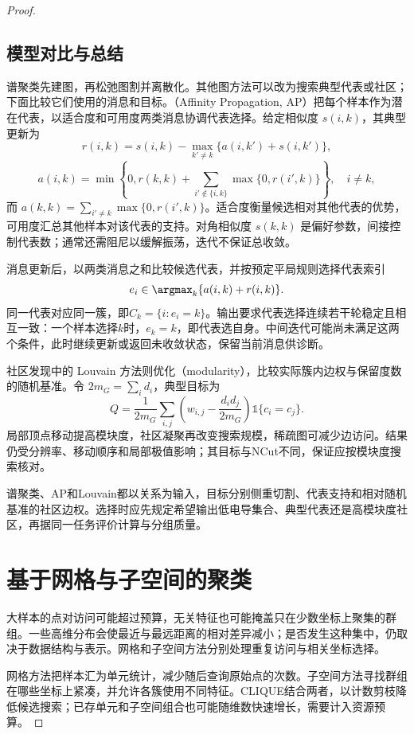 \begin{proof}
\subsection{模型对比与总结}

谱聚类先建图，再松弛图割并离散化。其他图方法可以改为搜索典型代表或社区；下面比较它们使用的消息和目标。（Affinity Propagation, AP）把每个样本作为潜在代表，以适合度和可用度两类消息协调代表选择。给定相似度 $s(i,k)$，其典型更新为
\[
 r(i,k)=s(i,k)-\max_{k'\ne k}\{a(i,k')+s(i,k')\},
\]
\[
 a(i,k)=
 \min\left\{0,r(k,k)+
 \sum_{i'\notin\{i,k\}}\max\{0,r(i',k)\}\right\},
 \quad i\ne k,
\]
而 $a(k,k)=\sum_{i'\ne k}\max\{0,r(i',k)\}$。适合度衡量候选相对其他代表的优势，可用度汇总其他样本对该代表的支持。对角相似度 $s(k,k)$ 是偏好参数，间接控制代表数；通常还需阻尼以缓解振荡，迭代不保证总收敛。

消息更新后，以两类消息之和比较候选代表，并按预定平局规则选择代表索引
\[
 e_i\in\argmax_k\{a(i,k)+r(i,k)\}.
\]
同一代表对应同一簇，即$C_k=\{i:e_i=k\}$。输出要求代表选择连续若干轮稳定且相互一致：一个样本选择$k$时，$e_k=k$，即代表选自身。中间迭代可能尚未满足这两个条件，此时继续更新或返回未收敛状态，保留当前消息供诊断。

社区发现中的 Louvain 方法则优化（modularity），比较实际簇内边权与保留度数的随机基准。令 $2m_G=\sum_i d_i$，典型目标为
\[
 Q=\frac{1}{2m_G}\sum_{i,j}
 \left(w_{i,j}-\frac{d_i d_j}{2m_G}\right)
 \mathbb{1}\{c_i=c_j\}.
\]
局部顶点移动提高模块度，社区凝聚再改变搜索规模，稀疏图可减少边访问。结果仍受分辨率、移动顺序和局部极值影响；其目标与NCut不同，保证应按模块度搜索核对。

谱聚类、AP和Louvain都以关系为输入，目标分别侧重切割、代表支持和相对随机基准的社区边权。选择时应先规定希望输出低电导集合、典型代表还是高模块度社区，再据同一任务评价计算与分组质量。

\section{基于网格与子空间的聚类}
\label{sec:clustering-subspace}

大样本的点对访问可能超过预算，无关特征也可能掩盖只在少数坐标上聚集的群组。一些高维分布会使最近与最远距离的相对差异减小；是否发生这种集中，仍取决于数据结构与表示。网格和子空间方法分别处理重复访问与相关坐标选择。

网格方法把样本汇为单元统计，减少随后查询原始点的次数。子空间方法寻找群组在哪些坐标上紧凑，并允许各簇使用不同特征。CLIQUE结合两者，以计数剪枝降低候选搜索；已存单元和子空间组合也可能随维数快速增长，需要计入资源预算。


\end{proof}

